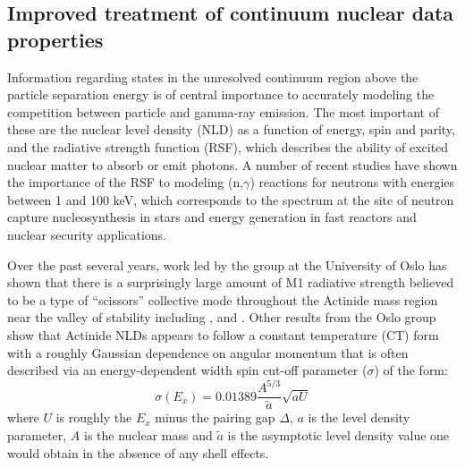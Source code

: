 \documentclass[letterpaper]{ar-1col}
\newcommand{\pp}[1]{\left( #1\right)}
\begin{document}
\subsection{Improved treatment of continuum nuclear data properties}

Information regarding states in the unresolved continuum region above the particle separation energy is of central importance to accurately modeling the competition between particle and gamma-ray emission.
 The most important of these are the nuclear level density (NLD) as a function of energy, spin and parity, and the radiative strength function (RSF), which describes the ability of excited nuclear matter to absorb or emit photons.
 A number of recent studies have shown the importance of the RSF to modeling (n,$\gamma$) reactions for neutrons with energies between 1 and 100 keV, which corresponds to the spectrum at the site of neutron capture nucleosynthesis in stars \cite{PhysRevC.82.014318, Lar15} and energy generation in fast reactors and nuclear security applications.
  
Over the past several years, work led by the group at the University of Oslo has shown that there is a surprisingly large amount of M1 radiative strength believed to be a type of \enquote{scissors} collective mode throughout the Actinide mass region near the valley of stability including ,  and  \cite{Lap16, Gut13, Gut13a, Gut14, Gut15}.
Other results from the Oslo group show that Actinide NLDs appears to follow a constant temperature (CT) form with a roughly Gaussian dependence on angular momentum that is often described via an energy-dependent width spin cut-off parameter ($\sigma$) of the form: 
\begin{equation}\label{eqn:spin_cutoff}
\sigma\pp{E_x}=0.01389 \dfrac{A^{5/3}}{\widetilde{a}}\sqrt{aU}
\end{equation}
where $U$ is roughly the $E_x$ minus the pairing gap $\Delta$, $a$ is the level density parameter, $A$ is the nuclear mass and $\widetilde{a}$ is the asymptotic level density value one would obtain in the absence of any shell effects.
\end{document}
